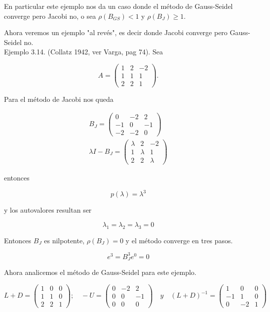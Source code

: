 \documentclass[10pt]{article}
\begin{document}
En particular este ejemplo nos da un caso donde el método de Gauss-Seidel converge pero Jacobi no, o sea $\rho\left(B_{G S}\right)<1$ y $\rho\left(B_{J}\right) \geq 1$.

Ahora veremos un ejemplo "al revés", es decir donde Jacobi converge pero Gauss-Seidel no.\\
Ejemplo 3.14. (Collatz 1942, ver Varga, pag 74). Sea

$$
A=\left(\begin{array}{ccc}
1 & 2 & -2 \\
1 & 1 & 1 \\
2 & 2 & 1
\end{array}\right) .
$$

Para el método de Jacobi nos queda

$$
\begin{gathered}
B_{J}=\left(\begin{array}{ccc}
0 & -2 & 2 \\
-1 & 0 & -1 \\
-2 & -2 & 0
\end{array}\right) \\
\lambda I-B_{J}=\left(\begin{array}{ccc}
\lambda & 2 & -2 \\
1 & \lambda & 1 \\
2 & 2 & \lambda
\end{array}\right)
\end{gathered}
$$

entonces

$$
p(\lambda)=\lambda^{3}
$$

y los autovalores resultan ser

$$
\lambda_{1}=\lambda_{2}=\lambda_{3}=0
$$

Entonces $B_{J}$ es nilpotente, $\rho\left(B_{J}\right)=0$ y el método converge en tres pasos.

$$
e^{3}=B_{J}^{3} e^{0}=0
$$

Ahora analicemos el método de Gauss-Seidel para este ejemplo.

$$
L+D=\left(\begin{array}{ccc}
1 & 0 & 0 \\
1 & 1 & 0 \\
2 & 2 & 1
\end{array}\right) ; \quad-U=\left(\begin{array}{ccc}
0 & -2 & 2 \\
0 & 0 & -1 \\
0 & 0 & 0
\end{array}\right) \quad y \quad(L+D)^{-1}=\left(\begin{array}{ccc}
1 & 0 & 0 \\
-1 & 1 & 0 \\
0 & -2 & 1
\end{array}\right)
$$
\end{document}
